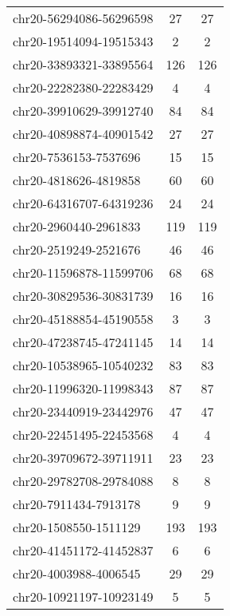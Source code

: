 \documentclass[10pt,letterpaper]{article}
\begin{document}
{\begin{longtable}{lSS}
	chr20-56294086-56296598 & 27     & 27                    \\
	chr20-19514094-19515343 & 2      & 2                     \\
	chr20-33893321-33895564 & 126    & 126                   \\
	chr20-22282380-22283429 & 4      & 4                     \\
	chr20-39910629-39912740 & 84     & 84                    \\
	chr20-40898874-40901542 & 27     & 27                    \\
	chr20-7536153-7537696   & 15     & 15                    \\
	chr20-4818626-4819858   & 60     & 60                    \\
	chr20-64316707-64319236 & 24     & 24                    \\
	chr20-2960440-2961833   & 119    & 119                   \\
	chr20-2519249-2521676   & 46     & 46                    \\
	chr20-11596878-11599706 & 68     & 68                    \\
	chr20-30829536-30831739 & 16     & 16                    \\
	chr20-45188854-45190558 & 3      & 3                     \\
	chr20-47238745-47241145 & 14     & 14                    \\
	chr20-10538965-10540232 & 83     & 83                    \\
	chr20-11996320-11998343 & 87     & 87                    \\
	chr20-23440919-23442976 & 47     & 47                    \\
	chr20-22451495-22453568 & 4      & 4                     \\
	chr20-39709672-39711911 & 23     & 23                    \\
	chr20-29782708-29784088 & 8      & 8                     \\
	chr20-7911434-7913178   & 9      & 9                     \\
	chr20-1508550-1511129   & 193    & 193                   \\
	chr20-41451172-41452837 & 6      & 6                     \\
	chr20-4003988-4006545   & 29     & 29                    \\
	chr20-10921197-10923149 & 5      & 5                     \\

\end{longtable}}
\end{document}
